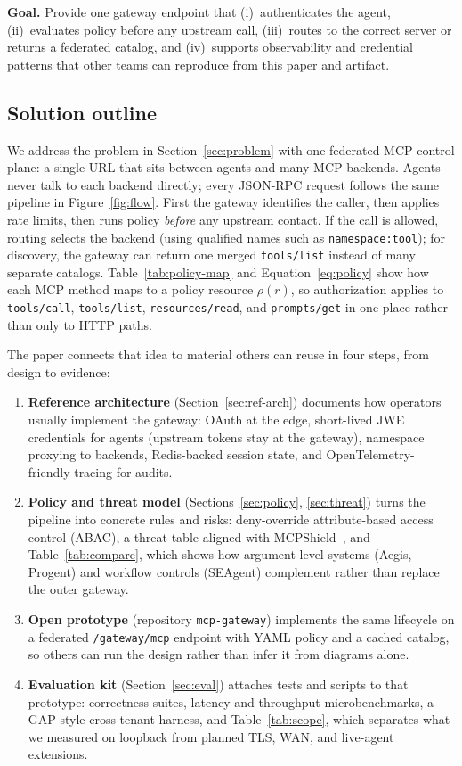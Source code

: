 \documentclass[11pt]{article}
\newcommand{\code}[1]{\texttt{#1}}
\newcommand{\aegis}{Aegis}
\newcommand{\mcpshield}{MCPShield}
\newcommand{\seagent}{SEAgent}
\newcommand{\mcpcp}{federated MCP control plane}
\begin{document}
\textbf{Goal.}
Provide one gateway endpoint that (i)~authenticates the agent, (ii)~evaluates policy before any upstream call, (iii)~routes to the correct server or returns a federated catalog, and (iv)~supports observability and credential patterns that other teams can reproduce from this paper and artifact.

\subsection{Solution outline}
\label{sec:solution}

We address the problem in Section~\ref{sec:problem} with one \mcpcp{}: a single URL that sits between agents and many MCP backends.
Agents never talk to each backend directly; every JSON-RPC request follows the same pipeline in Figure~\ref{fig:flow}.
First the gateway identifies the caller, then applies rate limits, then runs policy \emph{before} any upstream contact.
If the call is allowed, routing selects the backend (using qualified names such as \code{namespace:tool}); for discovery, the gateway can return one merged \code{tools/list} instead of many separate catalogs.
Table~\ref{tab:policy-map} and Equation~\eqref{eq:policy} show how each MCP method maps to a policy resource $\rho(r)$, so authorization applies to \code{tools/call}, \code{tools/list}, \code{resources/read}, and \code{prompts/get} in one place rather than only to HTTP paths.

The paper connects that idea to material others can reuse in four steps, from design to evidence:
\begin{enumerate}[leftmargin=*, itemsep=0.25em]
  \item \textbf{Reference architecture} (Section~\ref{sec:ref-arch}) documents how operators usually implement the gateway: OAuth at the edge, short-lived JWE credentials for agents (upstream tokens stay at the gateway), namespace proxying to backends, Redis-backed session state, and OpenTelemetry-friendly tracing for audits.
  \item \textbf{Policy and threat model} (Sections~\ref{sec:policy}, \ref{sec:threat}) turns the pipeline into concrete rules and risks: deny-override attribute-based access control (ABAC), a threat table aligned with \mcpshield~\cite{mcpshieldFormal2026}, and Table~\ref{tab:compare}, which shows how argument-level systems (\aegis, Progent) and workflow controls (\seagent) complement rather than replace the outer gateway.
  \item \textbf{Open prototype} (repository \code{mcp-gateway}) implements the same lifecycle on a federated \code{/gateway/mcp} endpoint with YAML policy and a cached catalog, so others can run the design rather than infer it from diagrams alone.
  \item \textbf{Evaluation kit} (Section~\ref{sec:eval}) attaches tests and scripts to that prototype: correctness suites, latency and throughput microbenchmarks, a GAP-style cross-tenant harness, and Table~\ref{tab:scope}, which separates what we measured on loopback from planned TLS, WAN, and live-agent extensions.
\end{enumerate}
\end{document}
